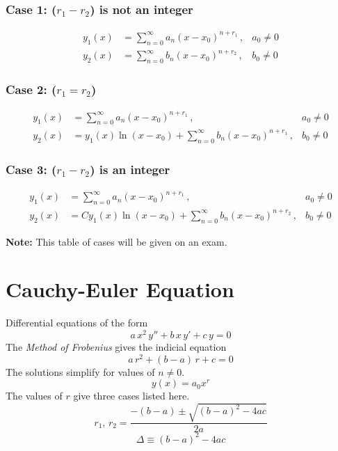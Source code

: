 \subsubsection{Case 1: ($r_1-r_2$) is not an integer}
\begin{align}
    y_1(x) & = \sum_{n=0}^\infty a_n (x-x_0)^{n+r_1}\,,  & a_0 \neq 0 \\
    y_2(x) & = \sum_{n=0}^\infty b_n (x-x_0)^{n+r_2}\,,  & b_0 \neq 0 
\end{align}

\subsubsection{Case 2: ($r_1=r_2$)}
\begin{align}
    y_1(x) & = \sum_{n=0}^\infty a_n (x-x_0)^{n+r_1}\,,  & a_0 \neq 0 \\
    y_2(x) & = y_1(x) \ln(x-x_0) + \sum_{n=0}^\infty b_n (x-x_0)^{n+r_1}\,, & b_0  \neq 0 
\end{align}

\subsubsection{Case 3: ($r_1-r_2$) is an integer}
\begin{align}
    y_1(x) & = \sum_{n=0}^\infty a_n (x-x_0)^{n+r_1}\,,  & a_0 \neq 0 \\
    y_2(x) & = C y_1(x) \ln(x-x_0) + \sum_{n=0}^\infty b_n (x-x_0)^{n+r_2}\,, & b_0  \neq 0 
\end{align}

\textbf{Note:} This table of cases will be given on an exam.


\section{Cauchy-Euler Equation}
Differential equations of the form
\begin{equation} \label{eq:cauchy-euler}
    a\, x^2\, y'' + b\, x\, y' + c\, y = 0
\end{equation}
The \emph{Method of Frobenius} gives the indicial equation
\begin{equation} \label{eq:ce-indicial}
    a\, r^2 + (b-a)\, r + c = 0
\end{equation}
The solutions simplify for values of $n\neq 0$.
\begin{equation} \label{eq:ce-sol}
    y(x) = a_0 x^r
\end{equation}
The values of $r$ give three cases listed here.
\begin{equation*}
    r_1,\,r_2 = \frac{-(b-a) \pm \sqrt{(b-a)^2-4ac}}{2a}
\end{equation*}
\begin{equation*}
    \Delta \equiv (b-a)^2-4ac
\end{equation*}

